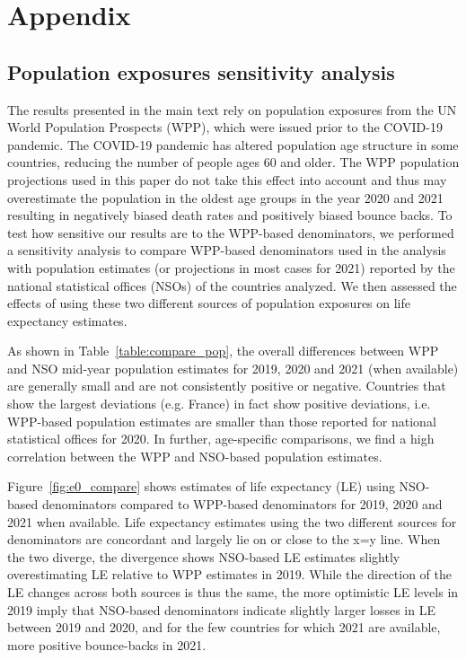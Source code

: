 \documentclass[12pt]{article}
\begin{document}
\clearpage
\section*{Appendix}

\subsection*{Population exposures sensitivity analysis}

The results presented in the main text rely on population exposures from the UN World Population Prospects (WPP), which were issued prior to the COVID-19 pandemic. The COVID-19 pandemic has altered population age structure in some countries, reducing the number of people ages 60 and older. The WPP population projections used in this paper do not take this effect into account and thus may overestimate the population in the oldest age groups in the year 2020 and 2021 resulting in negatively biased death rates and positively biased bounce backs. To test how sensitive our results are to the WPP-based denominators, we performed a sensitivity analysis to compare WPP-based denominators used in the analysis with population estimates (or projections in most cases for 2021) reported by the national statistical offices (NSOs) of the countries analyzed. We then assessed the effects of using these two different sources of population exposures on life expectancy estimates.

As shown in Table~\ref{table:compare_pop}, the overall differences between WPP and NSO mid-year population estimates for 2019, 2020 and 2021 (when available) are generally small and are not consistently positive or negative. Countries that show the largest deviations (e.g. France) in fact show positive deviations, i.e. WPP-based population estimates are smaller than those reported for national statistical offices for 2020. In further, age-specific comparisons, we find a high correlation between the WPP and NSO-based population estimates.

Figure~\ref{fig:e0_compare} shows estimates of life expectancy (LE) using NSO-based denominators compared to WPP-based denominators for 2019, 2020 and 2021 when available. Life expectancy estimates using the two different sources for denominators are concordant and largely lie on or close to the x=y line. When the two diverge, the divergence shows NSO-based LE estimates slightly overestimating LE relative to WPP estimates in 2019. While the direction of the LE changes across both sources is thus the same, the more optimistic LE levels in 2019 imply that NSO-based denominators indicate slightly larger losses in LE between 2019 and 2020, and for the few countries for which 2021 are available, more positive bounce-backs in 2021.
\end{document}
